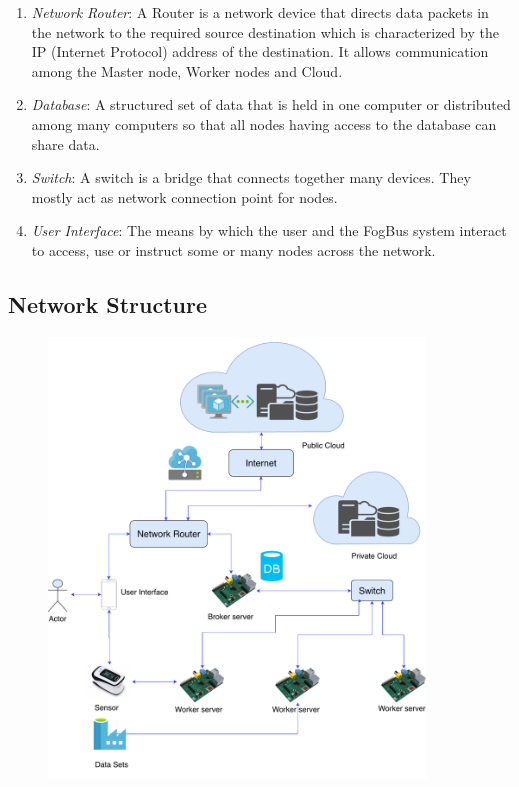 \documentclass[10pt,journal,compsoc]{IEEEtran}
\begin{document}
\begin{enumerate}
\item \textit{Network Router}: A Router is a network device that directs data packets in the network to the required source destination which is characterized by the IP (Internet Protocol) address of the destination. It allows communication among the Master node, Worker nodes and Cloud.
\item \textit{Database}: A structured set of data that is held in one computer or distributed among many computers so that all nodes having access to the database can share data.
\item \textit{Switch}: A switch is a bridge that connects together many devices. They mostly act as network connection point for nodes.
\item \textit{User Interface}: The means by which the user and the FogBus system interact to access, use or instruct some or many nodes across the network. 
\end{enumerate}

\subsection{Network Structure}
\begin{figure}[h]
\centering
\includegraphics[width=10cm]{network-arch}
\end{figure}
\end{document}
